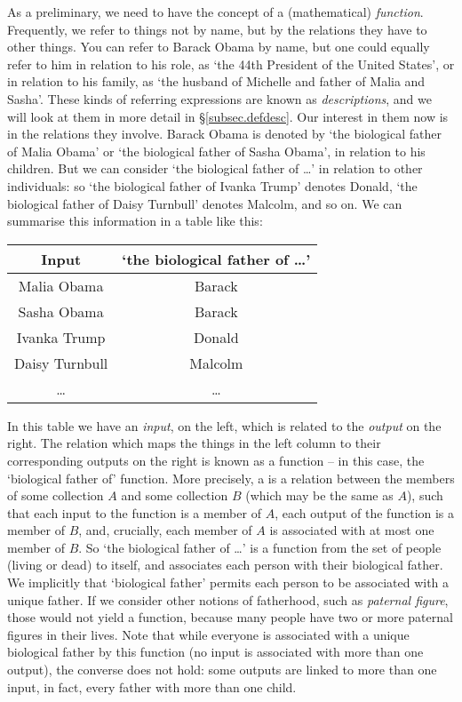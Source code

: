 As a preliminary, we need to have the concept of a (mathematical) \emph{function}. Frequently, we refer to things not by name, but by the relations they have to other things. You can refer to Barack Obama by name, but one could equally refer to him in relation to his role, as `the 44th President of the United States', or in relation to his family, as `the husband of Michelle and father of Malia and Sasha'. These kinds of referring expressions are known as \emph{descriptions}, and we will look at them in more detail in §\ref{subsec.defdesc}. Our interest in them now is in the relations they involve. Barack Obama is denoted by `the biological father of Malia Obama' or `the biological father of Sasha Obama', in relation to his children. But we can consider `the biological father of …' in relation to other individuals: so `the biological father of Ivanka Trump' denotes Donald, `the biological father of Daisy Turnbull' denotes Malcolm, and so on. We can summarise this information in a table like this: 
\begin{center}
\begin{tabular}{c|c} \toprule 
Input & `the biological father of …'\\
\midrule
Malia Obama & Barack \\
Sasha Obama & Barack \\
Ivanka Trump & Donald\\
Daisy Turnbull & Malcolm\\
… & … \\ \bottomrule
\end{tabular}
\end{center} In this table we have an \emph{input}, on the left, which is related to the \emph{output} on the right. The relation which maps the things in the left column to their corresponding outputs on the right is known as a function – in this case, the `biological father of' function. More precisely, a  is a relation between the members of some collection $A$ and some collection $B$ (which may be the same as $A$), such that each input to the function is a member of $A$, each output of the function is a member of $B$, and, crucially, each member of $A$ is associated with at most one member of $B$. So `the biological father of …' is a function from the set of people (living or dead) to itself, and associates each person with their biological father. We implicitly that `biological father' permits each person to be associated with a unique father. If we consider other notions of fatherhood, such as \emph{paternal figure}, those would not yield a function, because many people have two or more paternal figures in their lives. Note that while everyone is associated with a unique biological father by this function (no input is associated with more than one output), the converse does not hold: some outputs are linked to more than one input, in fact, every father with more than one child.

